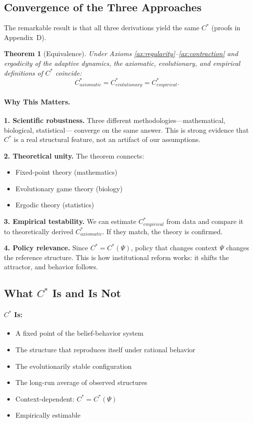 \documentclass[12pt,a4paper]{article}
\newtheorem{theorem}{Theorem}[section]
\begin{document}
\subsection{Convergence of the Three Approaches}

The remarkable result is that all three derivations yield the same $C^*$ (proofs in Appendix~D).

\begin{theorem}[Equivalence]
\label{thm:equivalence}
Under Axioms \ref{ax:regularity}--\ref{ax:contraction} 
and ergodicity of the adaptive dynamics,
the axiomatic, evolutionary, and empirical definitions of $C^*$ coincide:
\[
  C^*_{axiomatic} = C^*_{evolutionary} = C^*_{empirical}.
\]
\end{theorem}

\paragraph{Why This Matters.}

\textbf{1. Scientific robustness.}
Three different methodologies---mathematical, biological, statistical---
converge on the same answer. This is strong evidence that $C^*$ is
a real structural feature, not an artifact of our assumptions.

\textbf{2. Theoretical unity.}
The theorem connects:
\begin{itemize}
  \item Fixed-point theory (mathematics)
  \item Evolutionary game theory (biology)
  \item Ergodic theory (statistics)
\end{itemize}

\textbf{3. Empirical testability.}
We can estimate $C^*_{empirical}$ from data and compare it
to theoretically derived $C^*_{axiomatic}$.
If they match, the theory is confirmed.

\textbf{4. Policy relevance.}
Since $C^* = C^*(\Psi)$, policy that changes context $\Psi$
changes the reference structure. This is how institutional reform works:
it shifts the attractor, and behavior follows.

\subsection{What $C^*$ Is and Is Not}

\paragraph{$C^*$ Is:}
\begin{itemize}
  \item A fixed point of the belief-behavior system
  \item The structure that reproduces itself under rational behavior
  \item The evolutionarily stable configuration
  \item The long-run average of observed structures
  \item Context-dependent: $C^* = C^*(\Psi)$
  \item Empirically estimable
\end{itemize}
\end{document}
